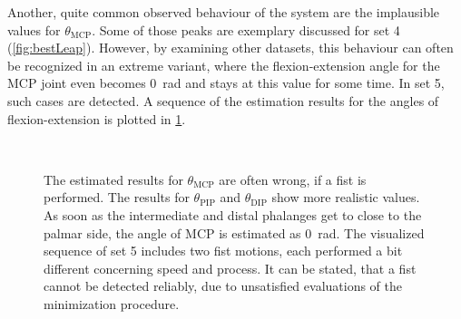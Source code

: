 Another, quite common observed behaviour of the system are the implausible values for $ \theta_{\mathrm{MCP}} $. Some of those peaks are exemplary discussed for set 4 (\ref{fig:bestLeap}). However, by examining other datasets, this behaviour can often be recognized in an extreme variant, where the flexion-extension angle for the \ac{MCP} joint even becomes \SI{0}{\radian} and stays at this value for some time. In set 5, such cases are detected. A sequence of the estimation results for the angles of flexion-extension is plotted in \ref{fig:set5}.
\begin{figure}[!htb]
\centering
{}\\
\caption[Occurrence of wrong estimated states for $ \theta_{\mathrm{MCP}} $]
{The estimated results for $ \theta_{\mathrm{MCP}} $ are often wrong, if a fist is performed. The results for $ \theta_{\mathrm{PIP}} $ and $ \theta_{\mathrm{DIP}} $ show more realistic values. As soon as the intermediate and distal phalanges get to close to the palmar side, the angle of \ac{MCP} is estimated as \SI{0}{\radian}. The visualized sequence of set 5 includes two fist motions, each performed a bit different concerning speed and process. It can be stated, that a fist cannot be detected reliably, due to unsatisfied evaluations of the minimization procedure.}
\label{fig:set5}
\end{figure}

